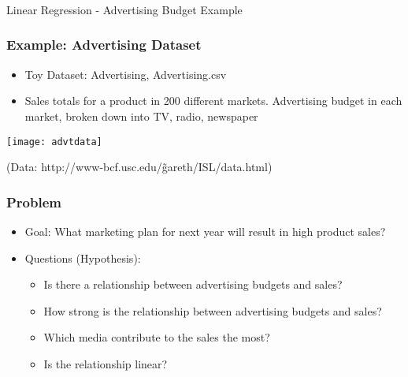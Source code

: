

\begin{frame}[fragile]\frametitle{}
\begin{center}
{\Large Linear Regression - Advertising Budget Example}
\end{center}
\end{frame}

\begin{frame}[fragile]\frametitle{Example: Advertising Dataset}
\begin{itemize}
\item Toy Dataset: Advertising, Advertising.csv 
\item Sales totals for a product in 200 different markets. Advertising budget in each market, broken down into TV, radio, newspaper
\end{itemize}
\begin{center}
\texttt{[image: advtdata]}
\end{center}
({\small Data: http://www-bcf.usc.edu/\~ gareth/ISL/data.html)}
\end{frame}


\begin{frame}[fragile]\frametitle{Problem}
\begin{itemize}
\item Goal: What marketing plan for next year will result in high product sales?
\item Questions (Hypothesis):
	\begin{itemize}
	\item Is there a relationship between advertising budgets and sales?
	\item How strong is the relationship between advertising budgets and sales?
	\item Which media contribute to the sales the most?
	\item Is the relationship linear?
	\end{itemize}
\end{itemize}
\end{frame}


